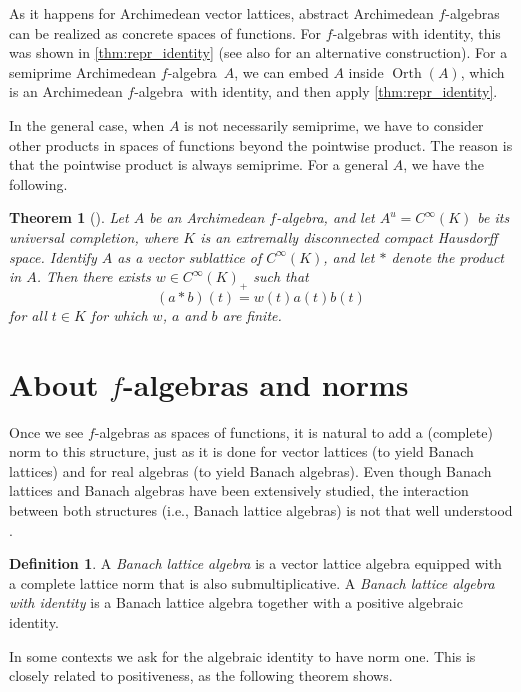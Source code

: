 \documentclass{memo-l}
\newtheorem{thm}[theorem]{Theorem}
\theoremstyle{definition}
\newtheorem{defn}[theorem]{Definition}
\theoremstyle{remark}
\numberwithin{section}{chapter}
\numberwithin{equation}{chapter}
\newcommand{\falg}{$f\!$-algebra}
\newcommand{\orth}[1]{\operatorname{Orth}(#1)}
\begin{document}
As it happens for
Archimedean vector lattices, abstract Archimedean \falg s can be
realized as concrete spaces of functions. For \falg s with identity,
this was shown in \cref{thm:repr_identity} (see also
\cite{henriksen_johnson1961} for an alternative construction). For
a semiprime Archimedean \falg\ $A$, we can embed $A$ inside $\orth A$,
which is an Archimedean \falg\ with identity, and then apply
\cref{thm:repr_identity}.

In the general case, when $A$ is not necessarily semiprime, we have to consider other products in spaces of functions beyond the pointwise product. The
reason is that the pointwise product is always semiprime. For a general
$A$, we have the following.

\begin{thm}[{\cite[Corollary 2.5]{buskes_wickstead2017}}]
    Let $A$ be an Archimedean \falg, and let $A^{u}=C^{\infty }(K)$ be
    its universal completion, where $K$ is an extremally disconnected
    compact Hausdorff space. Identify $A$ as a vector sublattice of
    $C^{\infty }(K)$, and let $\ast$ denote the product in $A$. Then
    there exists $w \in C^{\infty }(K)_+$ such that
    \[
        (a \ast b)(t)=w(t)a(t)b(t)
    \]
    for all $t \in K$ for which $w$, $a$ and $b$ are finite.
\end{thm}

\section{About $f$-algebras and norms}\label{sec:background_norms}

Once we see \falg s as spaces of functions, it is natural to add a
(complete) norm to this structure, just as it is done for vector lattices (to
yield Banach lattices) and for real algebras (to yield Banach
algebras). Even though Banach lattices and Banach algebras have been
extensively studied, the interaction between both structures (i.e.,
Banach lattice algebras) is not that well understood
\cite{wickstead2017_open,wickstead2017_questions}.

\begin{defn}
    A \emph{Banach lattice algebra} is a vector lattice algebra
    equipped with a complete lattice norm that is also
    submultiplicative. A \emph{Banach lattice algebra with identity}
    is a Banach lattice algebra together with a positive algebraic
    identity.
\end{defn}

In some contexts we ask for the algebraic identity to have norm one.
This is closely related to positiveness, as the following theorem shows.
\end{document}
